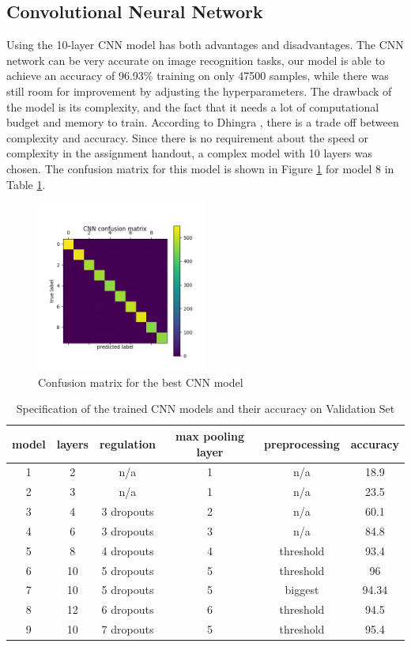 \documentclass[letterpaper, 10 pt, conference]{ieeeconf}  %
\begin{document}
\subsection{Convolutional Neural Network}
Using the 10-layer CNN model has both advantages and disadvantages. The CNN network can be very accurate on image recognition tasks, our model is able to achieve an accuracy of 96.93\% training on only 47500 samples, while there was still room for improvement by adjusting the hyperparameters. The drawback of the model is its complexity, and the fact that it needs a lot of computational budget and memory to train. According to Dhingra \cite{dhingra2017model}, there is a trade off between complexity and accuracy. Since there is no requirement about the speed or complexity in the assignment handout, a complex model with 10 layers was chosen. The confusion matrix for this model is shown in Figure \ref{fig:cnnconf} for model 8 in Table \ref{tab:CNNmodels}.
\begin{figure}
	\begin{center}
			\includegraphics[width=0.5\textwidth]{figures/cnn_conf.png}  %
		\caption{Confusion matrix for the best CNN model}
		\label{fig:cnnconf}
	\end{center}
\end{figure}


\begin{table}[t]
	\centering
	\caption{Specification of the trained CNN models and their accuracy on Validation Set}
	\label{tab:CNNmodels}
	\begin{tabular}{|c|c|c|c|c|c|}
		\hline
		model	&layers&	regulation&	max pooling layer&preprocessing&accuracy\\\hline
		1&	2& n/a & 1   &	n/a		&18.9\\\hline	
		2&	3&	n/a		&1  &	n/a		&23.5\\\hline
		3&	4&	3 dropouts&2&	n/a		&60.1\\\hline
		4&	6&	3 dropouts&3&	n/a		& 84.8	\\\hline
		5&	8&	4 dropouts&4&threshold&93.4	\\\hline
		6&	10&	5 dropouts&5&threshold &96\\\hline
		7& 10& 5 dropouts &5&biggest&94.34\\\hline
		8&	12&	6 dropouts&6&threshold&94.5\\\hline	
		9&	10&	7 dropouts&5&threshold&95.4\\\hline			
	\end{tabular}
\end{table}
\end{document}
